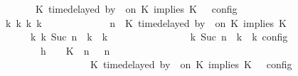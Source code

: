\begin{isabellebody}
\ \ \ \ \ \ \ \ \ \ \ \ \ \ {\isasymturnstile}\ {\isasymPsi}\ {\isasymtriangleright}\ {\isacharparenleft}{\isacharparenleft}K\ time{\isacharminus}delayed{\isasymsharp}\ by\ {\isasymdelta}{\isasymtau}\ on\ K\ implies\ K\ {\isacharhash}\ {\isasymPhi}{\isacharparenright}\ {\isasymrbrakk}\isactrlsub c\isactrlsub o\isactrlsub n\isactrlsub f\isactrlsub i\isactrlsub g\isanewline
\ \ \ \ \ \ \ \ \ \ {\isasymLongrightarrow}\ {\isasymexists}{\isasymGamma}\isactrlsub k\ {\isasymPsi}\isactrlsub k\ {\isasymPhi}\isactrlsub k\ k{\isachardot}\isanewline
\ \ \ \ \ \ \ \ \ \ \ \ {\isacharparenleft}{\isacharparenleft}{\isasymGamma}{\isacharcomma}\ n\ {\isasymturnstile}\ {\isacharparenleft}{\isacharparenleft}K\ time{\isacharminus}delayed{\isasymsharp}\ by\ {\isasymdelta}{\isasymtau}\ on\ K\ implies\ K\ {\isacharhash}\ {\isasymPsi}{\isacharparenright}\ {\isasymtriangleright}\ {\isasymPhi}{\isacharparenright}\isanewline
\ \ \ \ \ \ \ \ \ \ \ \ \ \ \ \ {\isasymhookrightarrow}\isactrlbsup k\isactrlesup \ {\isacharparenleft}{\isasymGamma}\isactrlsub k{\isacharcomma}\ Suc\ n\ {\isasymturnstile}\ {\isasymPsi}\isactrlsub k\ {\isasymtriangleright}\ {\isasymPhi}\isactrlsub k{\isacharparenright}{\isacharparenright}\isanewline
\ \ \ \ \ \ \ \ \ \ \ \ {\isasymand}\ {\isasymrho}\ {\isasymin}\ {\isasymlbrakk}\ {\isasymGamma}\isactrlsub k{\isacharcomma}\ Suc\ n\ {\isasymturnstile}\ {\isasymPsi}\isactrlsub k\ {\isasymtriangleright}\ {\isasymPhi}\isactrlsub k\ {\isasymrbrakk}\isactrlsub c\isactrlsub o\isactrlsub n\isactrlsub f\isactrlsub i\isactrlsub g{\isacartoucheclose}\isanewline
\ \ \ \ \ \ \isamarkupfalse%
\ {\isacharminus}\isanewline
\ \ \ \ \ \ \ \ \isamarkupfalse%
\ h{}{\isacharcolon}\ {\isacartoucheopen}{\isasymrho}\ {\isasymin}\ {\isasymlbrakk}\ {\isacharparenleft}{\isacharparenleft}K\ {\isasymnot}{\isasymUp}\ n{\isacharparenright}\ {\isacharhash}\ {\isasymGamma}{\isacharparenright}{\isacharcomma}\ n\isanewline
\ \ \ \ \ \ \ \ \ \ \ \ \ \ \ \ \ \ \ \ \ \ \ \ \ {\isasymturnstile}\ {\isasymPsi}\ {\isasymtriangleright}\ {\isacharparenleft}{\isacharparenleft}K\ time{\isacharminus}delayed{\isasymsharp}\ by\ {\isasymdelta}{\isasymtau}\ on\ K\ implies\ K\ {\isacharhash}\ {\isasymPhi}{\isacharparenright}\ {\isasymrbrakk}\isactrlsub c\isactrlsub o\isactrlsub n\isactrlsub f\isactrlsub i\isactrlsub g{\isacartoucheclose}\isanewline

\end{isabellebody}
